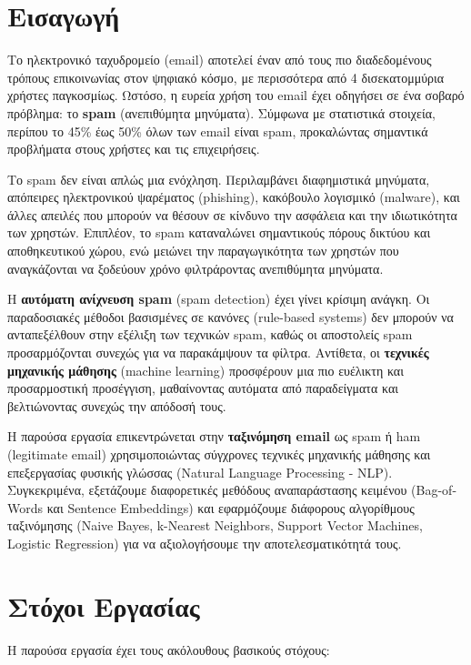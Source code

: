 \documentclass[12pt,a4paper,twoside]{book}
\begin{document}
\section{Εισαγωγή}

Το ηλεκτρονικό ταχυδρομείο (email) αποτελεί έναν από τους πιο διαδεδομένους τρόπους επικοινωνίας στον ψηφιακό κόσμο, με περισσότερα από 4 δισεκατομμύρια χρήστες παγκοσμίως. Ωστόσο, η ευρεία χρήση του email έχει οδηγήσει σε ένα σοβαρό πρόβλημα: το \textbf{spam} (ανεπιθύμητα μηνύματα). Σύμφωνα με στατιστικά στοιχεία, περίπου το 45\% έως 50\% όλων των email είναι spam, προκαλώντας σημαντικά προβλήματα στους χρήστες και τις επιχειρήσεις.

Το spam δεν είναι απλώς μια ενόχληση. Περιλαμβάνει διαφημιστικά μηνύματα, απόπειρες ηλεκτρονικού ψαρέματος (phishing), κακόβουλο λογισμικό (malware), και άλλες απειλές που μπορούν να θέσουν σε κίνδυνο την ασφάλεια και την ιδιωτικότητα των χρηστών. Επιπλέον, το spam καταναλώνει σημαντικούς πόρους δικτύου και αποθηκευτικού χώρου, ενώ μειώνει την παραγωγικότητα των χρηστών που αναγκάζονται να ξοδεύουν χρόνο φιλτράροντας ανεπιθύμητα μηνύματα.

Η \textbf{αυτόματη ανίχνευση spam} (spam detection) έχει γίνει κρίσιμη ανάγκη. Οι παραδοσιακές μέθοδοι βασισμένες σε κανόνες (rule-based systems) δεν μπορούν να ανταπεξέλθουν στην εξέλιξη των τεχνικών spam, καθώς οι αποστολείς spam προσαρμόζονται συνεχώς για να παρακάμψουν τα φίλτρα. Αντίθετα, οι \textbf{τεχνικές μηχανικής μάθησης} (machine learning) προσφέρουν μια πιο ευέλικτη και προσαρμοστική προσέγγιση, μαθαίνοντας αυτόματα από παραδείγματα και βελτιώνοντας συνεχώς την απόδοσή τους.

Η παρούσα εργασία επικεντρώνεται στην \textbf{ταξινόμηση email} ως spam ή ham (legitimate email) χρησιμοποιώντας σύγχρονες τεχνικές μηχανικής μάθησης και επεξεργασίας φυσικής γλώσσας (Natural Language Processing - NLP). Συγκεκριμένα, εξετάζουμε διαφορετικές μεθόδους αναπαράστασης κειμένου (Bag-of-Words και Sentence Embeddings) και εφαρμόζουμε διάφορους αλγορίθμους ταξινόμησης (Naive Bayes, k-Nearest Neighbors, Support Vector Machines, Logistic Regression) για να αξιολογήσουμε την αποτελεσματικότητά τους.

\section{Στόχοι Εργασίας}

Η παρούσα εργασία έχει τους ακόλουθους βασικούς στόχους:
\end{document}
